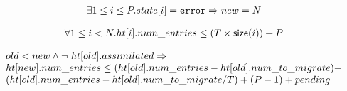 \begin{lemma}
  \begin{equation*}
\begin{array}{l}      
  \exists 1 \leq i \leq P. state[i] = \mbox{\texttt{error}} \Rightarrow new = N
\end{array}
\end{equation*}  
  \label{out_of_mem}  
\end{lemma}


\begin{lemma}
  \begin{equation*}
\begin{array}{l}      
  \forall 1 \leq i < N. \mbox{$ht[i]$}.num\_entries \leq (T \times \mathsf{size}(i)) + P
\end{array}
  \end{equation*}
  \label{upper_global}
\end{lemma}

\begin{lemma}
  \begin{equation*}
\begin{array}{l}    
  old < new \wedge \mbox{$\neg\ \mbox{$ht[old]$}.assimilated$} \Rightarrow \\
  \mbox{$ht[new]$}.num\_entries \leq (\mbox{$ht[old]$}.num\_entries - \mbox{$ht[old]$}.num\_to\_migrate) + \\
  (\mbox{$ht[old]$}.num\_entries - \mbox{$ht[old]$}.num\_to\_migrate / T) + (P-1) + pending
\end{array}
\end{equation*}
  \label{upper}
\end{lemma}

